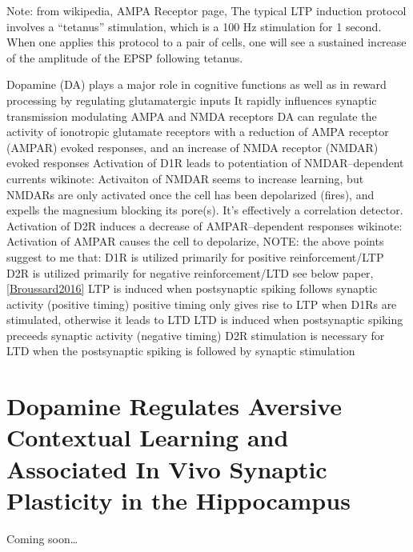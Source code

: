 \documentclass[11pt, a4paper, oneside]{article}   	%
\begin{document}
Note: from wikipedia, AMPA Receptor page, The typical LTP induction protocol involves a “tetanus” stimulation, which is a 100 Hz stimulation for 1 second. When one applies this protocol to a pair of cells, one will see a sustained increase of the amplitude of the EPSP following tetanus.
\begin{outline}
   \point Dopamine (DA) plays a major role in cognitive functions as well as in reward processing by regulating glutamatergic inputs
   \point It rapidly influences synaptic transmission modulating AMPA and NMDA receptors
   \point DA can regulate the activity of ionotropic glutamate receptors with a reduction of AMPA receptor (AMPAR) evoked responses, and an increase of NMDA receptor (NMDAR) evoked responses
    \subpoint Activation of D1R leads to potentiation of NMDAR--dependent currents
        \subsubpoint wikinote: Activaiton of NMDAR seems to increase learning, but NMDARs are only activated once the cell has been depolarized (fires), and expells the magnesium blocking its pore(s). It's effectively a correlation detector.
    \subpoint Activation of D2R induces a decrease of AMPAR--dependent responses
        \subsubpoint wikinote: Activation of AMPAR causes the cell to depolarize, 
    \subpoint NOTE: the above points suggest to me that:
        \subsubpoint D1R is utilized primarily for positive reinforcement/LTP
        \subsubpoint D2R is utilized primarily for negative reinforcement/LTD
        \subsubpoint see below paper, \ref{Broussard2016} 
    \point LTP is induced when postsynaptic spiking follows synaptic activity (positive timing)
        \subpoint positive timing only gives rise to LTP when D1Rs are stimulated, otherwise it leads to LTD
    \point LTD is induced when postsynaptic spiking preceeds synaptic activity (negative timing)
        \subpoint D2R stimulation is necessary for LTD when the postsynaptic spiking is followed by synaptic stimulation

\end{outline}

\section{Dopamine Regulates Aversive Contextual Learning and Associated In Vivo Synaptic Plasticity in the Hippocampus \cite{Broussard2016}}
 

Coming soon\ldots



\end{document}
